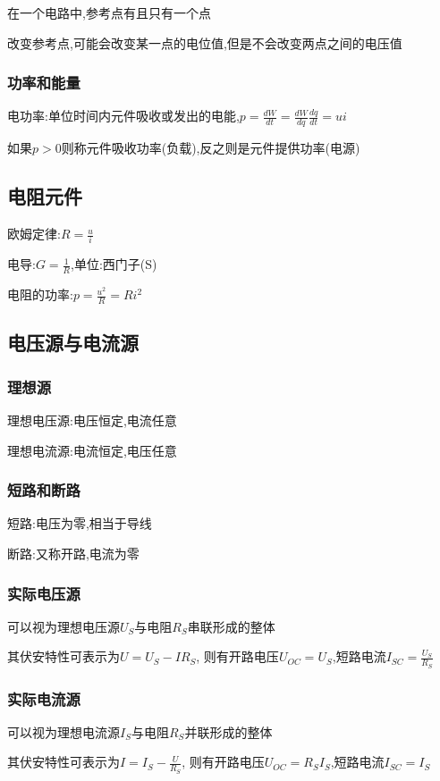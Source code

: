 \documentclass[12pt,a4paper,oneside]{ctexart}
\begin{document}
在一个电路中,参考点有且只有一个点

改变参考点,可能会改变某一点的电位值,但是不会改变两点之间的电压值

\subsubsection{功率和能量}
电功率:单位时间内元件吸收或发出的电能,$p=\frac{dW}{dt}=\frac{dW}{dq}\frac{dq}{dt}=ui$

如果$p>0$则称元件吸收功率(负载),反之则是元件提供功率(电源)

\subsection{电阻元件}
欧姆定律:$R=\frac{u}{i}$

电导:$G=\frac{1}{R}$,单位:西门子(S)

电阻的功率:$p=\frac{u^2}{R}=Ri^2$

\subsection{电压源与电流源}
\subsubsection{理想源}
理想电压源:电压恒定,电流任意

理想电流源:电流恒定,电压任意

\subsubsection{短路和断路}
短路:电压为零,相当于导线

断路:又称开路,电流为零

\subsubsection{实际电压源}
可以视为理想电压源$U_S$与电阻$R_S$串联形成的整体

其伏安特性可表示为$U=U_S-IR_S$,
则有开路电压$U_{OC}=U_S$,短路电流$I_{SC}=\frac{U_S}{R_S}$

\subsubsection{实际电流源}
可以视为理想电流源$I_S$与电阻$R_S$并联形成的整体

其伏安特性可表示为$I=I_S-\frac{U}{R_S}$,
则有开路电压$U_{OC}=R_SI_S$,短路电流$I_{SC}=I_S$
\end{document}
